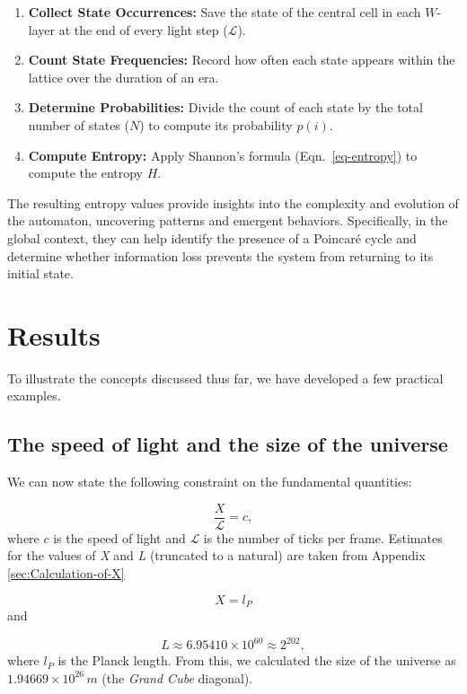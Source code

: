 \documentclass[12pt,english]{article}
\begin{document}
\begin{enumerate}
    \item \textbf{Collect State Occurrences:} Save the state of the central cell in each \( W \)-layer at the end of every light step (\( \mathcal{L} \)).
    \item \textbf{Count State Frequencies:} Record how often each state appears within the lattice over the duration of an era.
    \item \textbf{Determine Probabilities:} Divide the count of each state by the total number of states (\( N \)) to compute its probability \( p(i) \).
    \item \textbf{Compute Entropy:} Apply Shannon's formula (Eqn.~\ref{eq-entropy}) to compute the entropy \( H \).
\end{enumerate}

The resulting entropy values provide insights into the complexity and evolution of the automaton, uncovering patterns and emergent behaviors. Specifically, in the global context, they can help identify the presence of a Poincaré cycle and determine whether information loss prevents the system from returning to its initial state.


\section{Results}\label{sec:Results}

To illustrate the concepts discussed thus far, we have developed a few practical examples.

\subsection{The speed of light and the size of the universe}

We can now state the following constraint on the fundamental quantities:

\[
\frac{X}{\mathcal{L}}=c,
\]
where $c$ is the speed of light and $\mathcal{L}$ is the number of ticks per frame. Estimates for the values of \emph{X} and \emph{L }(truncated to a natural) are taken from Appendix \ref{sec:Calculation-of-X}

\[
X=l_{P}
\]
and

\[
L\approx6.95410\times10^{60}\approx2^{202},
\]
where $l_{P}$ is the Planck length. From this, we calculated the size of the universe as $1.94669\times10^{26}\,m$ (the \emph{Grand Cube} diagonal).
\end{document}
